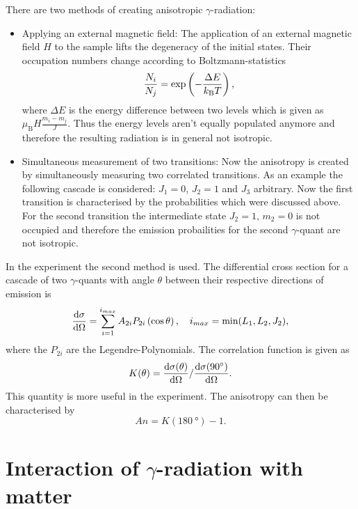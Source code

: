 There are two methods of creating anisotropic $\gamma$-radiation:
\begin{itemize}
 \item Applying an external magnetic field: The application of an external magnetic field $H$ to the sample lifts the degeneracy of the initial states. Their occupation numbers change according to Boltzmann-statistics
	\begin{equation}
	 \frac{N_{i}}{N_{j}} = \exp\left(-\frac{\Delta E}{k_{\textrm{B}} T}\right),
	\end{equation}
	where $\Delta E$ is the energy difference between two levels which is given as $\mu_{\textrm{B}}H\frac{m_{i}-m_{j}}{J}$. Thus the energy levels aren't equally populated anymore and therefore the resulting radiation is in general not isotropic.
 \item Simultaneous measurement of two transitions: Now the anisotropy is created by simultaneously measuring two correlated transitions. As an example the following cascade is considered: $J_{1}=0$, $J_{2}=1$ and $J_{3}$ arbitrary. Now the first transition is characterised by the probabilities which were discussed above. For the second transition the intermediate state $J_{2}=1, \, m_{2}=0$ is not occupied and therefore the emission probailities for the second $\gamma$-quant are not isotropic.  
\end{itemize}

In the experiment the second method is used. The differential cross section for a cascade of two $\gamma$-quants with angle $\theta$ between their respective directions of emission is \cite{BB}
\begin{equation}
 \frac{\text{d}\sigma}{\text{d}\Omega} = \sum_{i=1}^{i_{max}} A_{2i}P_{2i}\left(\cos\theta\right), \quad i_{max}= \textrm{min}(L_{1},L_{2},J_{2}),
\end{equation}
where the $P_{2i}$ are the Legendre-Polynomials. The correlation function is given as
\begin{equation}
 K(\theta) = \frac{\text{d}\sigma(\theta)}{\text{d}\Omega} / \frac{\text{d}\sigma(\SI{90}{\degree})}{\text{d}\Omega}.
\end{equation}
This quantity is more useful in the experiment. The anisotropy can then be characterised by
\begin{equation}
 An = K(\SI{180}{\degree})-1.
\end{equation}

\section{Interaction of $\gamma$-radiation with matter}

